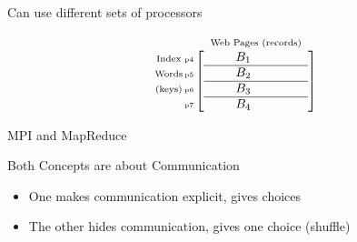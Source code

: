 \begin{frame}
\begin{block}{Can use different sets of processors}
\begin{center}
\begin{equation*}
\begin{array}{c@{\hspace{-2ex}}r@{\hspace{-2ex}}c}
          \begin{array}{c}
            \mbox{\scriptsize Index} \\
            \mbox{\scriptsize Words} \\
            \mbox{\scriptsize (keys)}
          \end{array} &
          \begin{array}{c}
            \\  \mbox{\tiny p4} \\ \mbox{\tiny p5} \\
            \mbox{\tiny p6} \\ \mbox{\tiny p7}
          \end{array} &
          \begin{array}{c}
            \mbox{\scriptsize Web Pages (records)} \\
            \left[
            \begin{array}{cccc}
              \quad  & B_1  & \quad & \quad \\
              \hline
              \quad  & B_2  & \quad  &  \quad \\
              \hline
              \quad  & B_3  & \quad  &  \quad \\
              \hline
              \quad  & B_4  & \quad  & \quad
            \end{array}
            \right]
          \end{array}
        \end{array}
      \end{equation*}
    \end{center}
  \end{block}
\end{frame}

\begin{frame}{MPI and MapReduce}
  \begin{block}{Both Concepts are about Communication}
    \begin{itemize}
    \item One makes communication explicit, gives choices
    \item The other hides communication, gives one choice (shuffle)
    \end{itemize}
  \end{block}
\end{frame}

